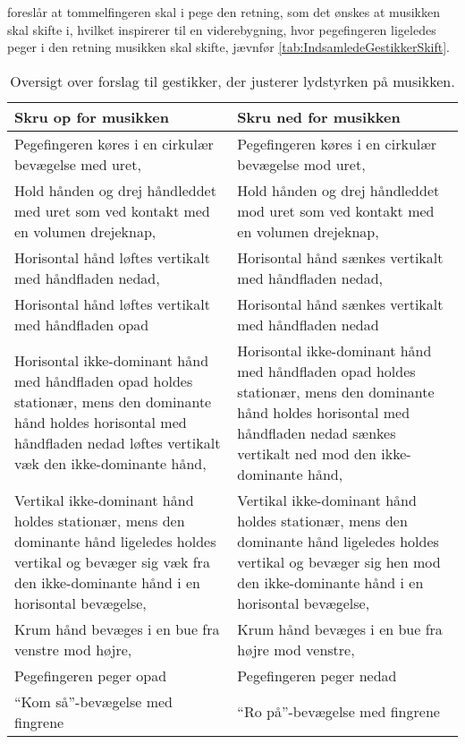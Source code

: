 \textcite[s. 166]{PDF:ComparingInputModalities} foreslår at tommelfingeren skal i pege den retning, som det ønskes at musikken skal skifte i, hvilket inspirerer til en viderebygning, hvor pegefingeren ligeledes peger i den retning musikken skal skifte, jævnfør \autoref{tab:IndsamledeGestikkerSkift}.            
%
\begin{table}[H]
	\centering
	\begin{tabular}{| p{6cm} | p{6cm} |}
		\hline
		\textbf{Skru op for musikken} & \textbf{Skru ned for musikken} \\ \hline
		Pegefingeren køres i en cirkulær bevægelse med uret, \parencite{WEB:BeosoundMoment, WEB:BMW7} & Pegefingeren køres i en cirkulær bevægelse mod uret, \parencite{WEB:BeosoundMoment, WEB:BMW7} \\ \hline
		Hold hånden og drej håndleddet med uret som ved kontakt med en volumen drejeknap, \parencite{WEB:Beosound2} & Hold hånden og drej håndleddet mod uret som ved kontakt med en volumen drejeknap, \parencite{WEB:Beosound2} \\ \hline
		Horisontal hånd løftes vertikalt med håndfladen nedad, \parencite[s. 166]{PDF:ComparingInputModalities} & Horisontal hånd sænkes vertikalt med håndfladen nedad, \parencite[s. 166]{PDF:ComparingInputModalities} \\ \hline
		Horisontal hånd løftes vertikalt med håndfladen opad & Horisontal hånd sænkes vertikalt med håndfladen nedad \\ \hline
		Horisontal ikke-dominant hånd med håndfladen opad holdes stationær, mens den dominante hånd holdes horisontal med håndfladen nedad løftes vertikalt væk den ikke-dominante hånd, \parencite[s. 48]{PDF:UserDefinedGesturesTV} & Horisontal ikke-dominant hånd med håndfladen opad holdes stationær, mens den dominante hånd holdes horisontal med håndfladen nedad sænkes vertikalt ned mod den ikke-dominante hånd, \parencite[s. 48]{PDF:UserDefinedGesturesTV} \\ \hline
		Vertikal ikke-dominant hånd holdes stationær, mens den dominante hånd ligeledes holdes vertikal og bevæger sig væk fra den ikke-dominante hånd i en horisontal bevægelse, \parencite[s. 48]{PDF:UserDefinedGesturesTV} & Vertikal ikke-dominant hånd holdes stationær, mens den dominante hånd ligeledes holdes vertikal og bevæger sig hen mod den ikke-dominante hånd i en horisontal bevægelse, \parencite[s. 48]{PDF:UserDefinedGesturesTV} \\ \hline
		Krum hånd bevæges i en bue fra venstre mod højre, \parencite{WEB:BeoplayA9} & Krum hånd bevæges i en bue fra højre mod venstre, \parencite{WEB:BeoplayA9} \\ \hline
		Pegefingeren peger opad & Pegefingeren peger nedad \\ \hline
		\enquote{Kom så}-bevægelse med fingrene & \enquote{Ro på}-bevægelse med fingrene \\ \hline		
	\end{tabular}
	\caption{Oversigt over forslag til gestikker, der justerer lydstyrken på musikken.}
	\label{tab:IndsamledeGestikkerVolumen}
\end{table}
